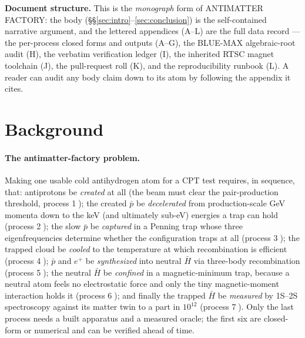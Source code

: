 \documentclass[11pt,a4paper]{article}
\begin{document}
\smallskip\noindent\textbf{Document structure.} This is the
\emph{monograph} form of ANTIMATTER FACTORY: the body
(\S\S\ref{sec:intro}--\ref{sec:conclusion}) is the self-contained narrative
argument, and the lettered appendices (A--L) are the full data record ---
the per-process closed forms and outputs (A--G), the BLUE-MAX algebraic-root
audit (H), the verbatim verification ledger (I), the inherited RTSC magnet
toolchain (J), the pull-request roll (K), and the reproducibility runbook
(L). A reader can audit any body claim down to its atom by following the
appendix it cites.

\section{Background}
\label{sec:bg}

\paragraph{The antimatter-factory problem.} Making one usable cold
antihydrogen atom for a CPT test requires, in sequence, that: antiprotons be
\emph{created} at all (the beam must clear the pair-production threshold,
process \textcircled{\scriptsize 1}); the created $\bar p$ be
\emph{decelerated} from production-scale GeV momenta down to the keV (and
ultimately sub-eV) energies a trap can hold (process
\textcircled{\scriptsize 2}); the slow $\bar p$ be \emph{captured} in a
Penning trap whose three eigenfrequencies determine whether the configuration
traps at all (process \textcircled{\scriptsize 3}); the trapped cloud be
\emph{cooled} to the temperature at which recombination is efficient
(process \textcircled{\scriptsize 4}); $\bar p$ and $e^+$ be \emph{synthesized}
into neutral $\bar H$ via three-body recombination (process
\textcircled{\scriptsize 5}); the neutral $\bar H$ be \emph{confined} in a
magnetic-minimum trap, because a neutral atom feels no electrostatic force and
only the tiny magnetic-moment interaction holds it (process
\textcircled{\scriptsize 6}); and finally the trapped $\bar H$ be
\emph{measured} by 1S--2S spectroscopy against its matter twin to a part in
$10^{12}$ (process \textcircled{\scriptsize 7}). Only the last process needs
a built apparatus and a measured oracle; the first six are closed-form or
numerical and can be verified ahead of time.
\end{document}
